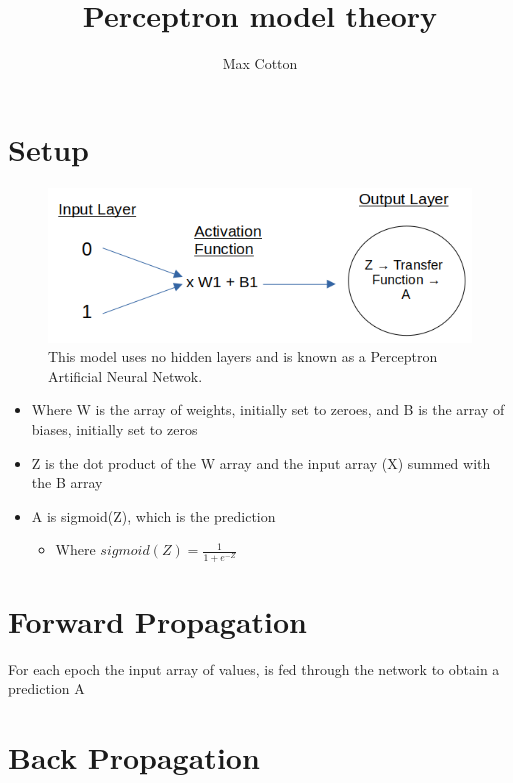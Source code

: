 \documentclass[10pt,a4paper]{article}
\title{Perceptron model theory}
\author{Max Cotton}
\date{}
\begin{document}
\maketitle

\section{Setup}

\begin{figure}[h!]
\centering
\includegraphics[width=1\textwidth]{src/utils/images/perceptron-ann-diagram.png}
\caption{This model uses no hidden layers and is known as a Perceptron Artificial Neural Netwok.}
\end{figure}

\begin{itemize}
    \item Where W is the array of weights, initially set to zeroes, and B is the array of biases, initially set to zeros
    \item Z is the dot product of the W array and the input array (X) summed with the B array
    \item A is sigmoid(Z), which is the prediction
    \begin{itemize}
        \item Where $sigmoid(Z) = \frac{1}{1+e^{-Z}}$
    \end{itemize}
\end{itemize}

\section{Forward Propagation}
For each epoch the input array of values, is fed through the network to obtain a prediction A

\section{Back Propagation}
\end{document}
